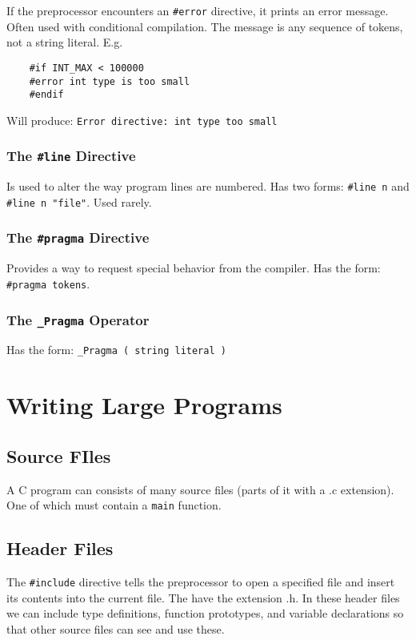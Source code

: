 \documentclass[openany]{book}
\begin{document}
    If the preprocessor encounters an \texttt{\#error} directive, it prints an error message. Often used with conditional compilation. The message is any sequence of tokens, not a string literal. E.g.

    \begin{lstlisting}
    #if INT_MAX < 100000
    #error int type is too small
    #endif
    \end{lstlisting}
    Will produce: \texttt{Error directive: int type too small}
    
    \subsection*{The \texttt{\#line} Directive}
    Is used to alter the way program lines are numbered. Has two forms: \texttt{\#line n} and \texttt{\#line n "file"}. Used rarely.

    \subsection*{The \texttt{\#pragma} Directive}
    Provides a way to request special behavior from the compiler. Has the form: \texttt{\#pragma tokens}.

    \subsection*{The \texttt{\_Pragma} Operator}
    Has the form: \texttt{\_Pragma ( string literal )}



    \chapter{Writing Large Programs}

    \section{Source FIles}
    A C program can consists of many source files (parts of it with a .c extension). One of which must contain a \texttt{main} function.

    \section{Header Files}
    The \texttt{\#include} directive tells the preprocessor to open a specified file and insert its contents into the current file. The have the extension .h. In these header files we can include type definitions, function prototypes, and variable declarations so that other source files can see and use these.
\end{document}
